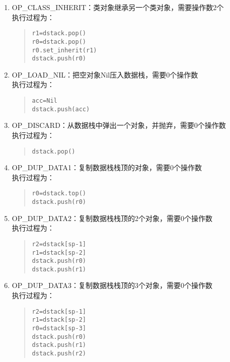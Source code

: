 \begin{enumerate}
\item OP\_CLASS\_INHERIT：类对象继承另一个类对象，需要操作数2个 \\
执行过程为：
\begin{quote}
\begin{verbatim}
r1=dstack.pop()
r0=dstack.pop()
r0.set_inherit(r1)
dstack.push(r0)
\end{verbatim}
\end{quote}

\item OP\_LOAD\_NIL：把空对象Nil压入数据栈，需要0个操作数  \\
执行过程为：
\begin{quote}
\begin{verbatim}
acc=Nil
dstack.push(acc)
\end{verbatim}
\end{quote}

\item OP\_DISCARD：从数据栈中弹出一个对象，并抛弃，需要0个操作数 \\
执行过程为：
\begin{quote}
\begin{verbatim}
dstack.pop()
\end{verbatim}
\end{quote}

\item OP\_DUP\_DATA1：复制数据栈栈顶的对象，需要0个操作数 \\
执行过程为：
\begin{quote}
\begin{verbatim}
r0=dstack.top()
dstack.push(r0)
\end{verbatim}
\end{quote}

\item OP\_DUP\_DATA2：复制数据栈栈顶的2个对象，需要0个操作数 \\
执行过程为：
\begin{quote}
\begin{verbatim}
r2=dstack[sp-1]
r1=dstack[sp-2]
dstack.push(r0)
dstack.push(r1)
\end{verbatim}
\end{quote}

\item OP\_DUP\_DATA3：复制数据栈栈顶的3个对象，需要0个操作数 \\
执行过程为：
\begin{quote}
\begin{verbatim}
r2=dstack[sp-1]
r1=dstack[sp-2]
r0=dstack[sp-3]
dstack.push(r0)
dstack.push(r1)
dstack.push(r2)
\end{verbatim}
\end{quote}


\end{enumerate}
